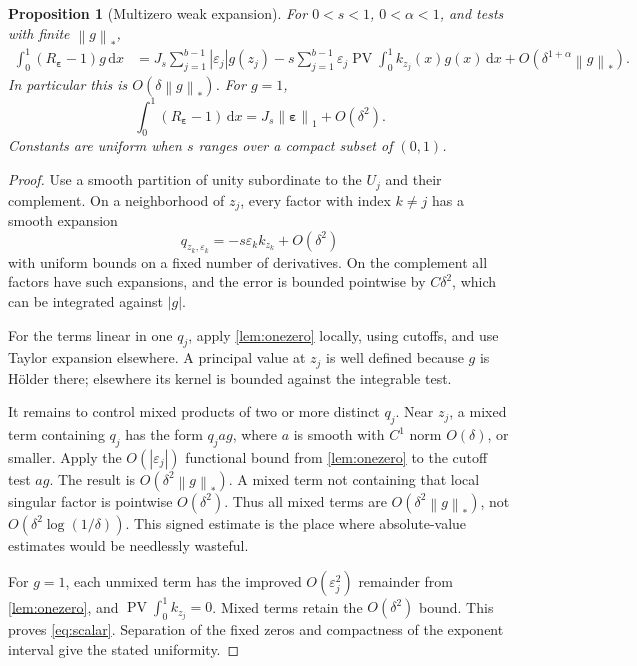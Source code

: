 \documentclass[11pt,a4paper]{article}
\numberwithin{equation}{section}
\newtheorem{proposition}[proposition]{Proposition}
\theoremstyle{definition}
\theoremstyle{remark}
\newcommand{\dd}{\,\mathrm d}
\newcommand{\PV}{\operatorname{PV}}
\newcommand{\norm}[1]{\left\lVert#1\right\rVert}
\newcommand{\eps}{\boldsymbol\varepsilon}
\begin{document}
\begin{proposition}[Multizero weak expansion]
\label{prop:multizero}
For $0<s<1$, $0<\alpha<1$, and tests with finite $\norm g_*$,
\begin{align}
 \int_0^1(R_{\eps}-1)g\dd x
 &=J_s\sum_{j=1}^{b-1}|\varepsilon_j|g(z_j)
   -s\sum_{j=1}^{b-1}\varepsilon_j\PV\!\int_0^1 k_{z_j}(x)g(x)\dd x
   +O(\delta^{1+\alpha}\norm g_*).
 \label{eq:multizero}
\end{align}
In particular this is $O(\delta\norm g_*)$. For $g=1$,
\begin{equation}
 \int_0^1(R_{\eps}-1)\dd x
       =J_s\norm\eps_1+O(\delta^2).
 \label{eq:scalar}
\end{equation}
Constants are uniform when $s$ ranges over a compact subset of $(0,1)$.
\end{proposition}
\begin{proof}
Use a smooth partition of unity subordinate to the $U_j$ and their
complement. On a neighborhood of $z_j$, every factor with index
$k\ne j$ has a smooth expansion
\[
 q_{z_k,\varepsilon_k}=-s\varepsilon_k k_{z_k}+O(\delta^2)
\]
with uniform bounds on a fixed number of derivatives. On the
complement all factors have such expansions, and the error is bounded
pointwise by $C\delta^2$, which can be integrated against $|g|$.

For the terms linear in one $q_j$, apply \cref{lem:onezero} locally,
using cutoffs, and use Taylor expansion elsewhere. A principal value
at $z_j$ is well defined because $g$ is H\"older there; elsewhere its
kernel is bounded against the integrable test.

It remains to control mixed products of two or more distinct $q_j$.
Near $z_j$, a mixed term containing $q_j$ has the form $q_j a g$,
where $a$ is smooth with $C^1$ norm $O(\delta)$, or smaller. Apply the
$O(|\varepsilon_j|)$ functional bound from \cref{lem:onezero} to the
cutoff test $ag$. The result is $O(\delta^2\norm g_*)$.
A mixed term not containing that local singular factor is pointwise
$O(\delta^2)$. Thus all mixed terms are $O(\delta^2\norm g_*)$,
not $O(\delta^2\log(1/\delta))$. This signed estimate is the place
where absolute-value estimates would be needlessly wasteful.

For $g=1$, each unmixed term has the improved $O(\varepsilon_j^2)$
remainder from \cref{lem:onezero}, and
$\PV\int_0^1 k_{z_j}=0$. Mixed terms retain the $O(\delta^2)$ bound.
This proves \cref{eq:scalar}. Separation of the fixed zeros and compactness
of the exponent interval give the stated uniformity.
\end{proof}
\end{document}
